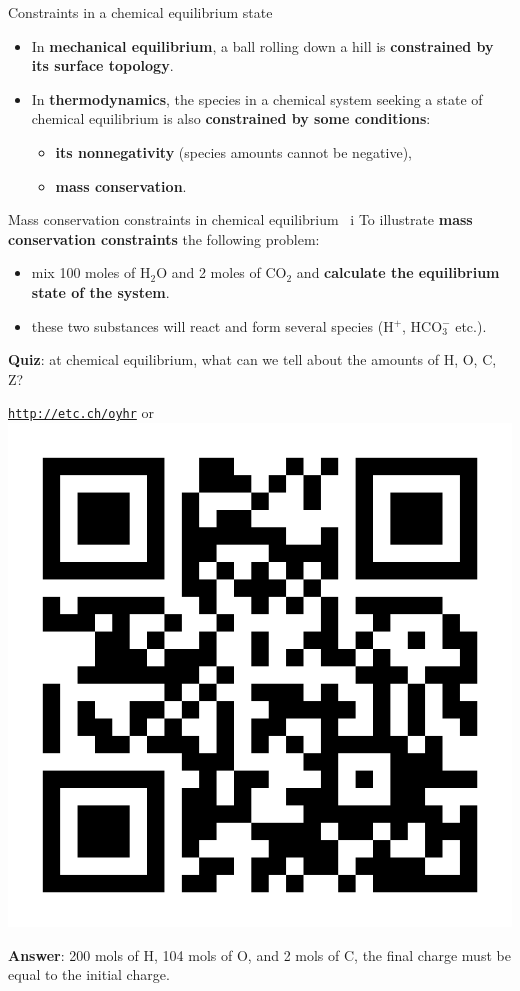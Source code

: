 %
\begin{frame}{Constraints in a chemical equilibrium state}
\begin{itemize}
\item In \alert{\textbf{mechanical equilibrium}}, a ball rolling down a hill is \textbf{constrained by its surface topology}. 
\pause
\item In \textbf{thermodynamics}, the species in a chemical system seeking a state of chemical
equilibrium is also \textbf{constrained by some conditions}: 
\begin{itemize}
\item \textbf{its nonnegativity} (species amounts cannot be negative),
\item \alert{\textbf{mass conservation}}.
\end{itemize}
\end{itemize}
\end{frame}
%
%
%
\begin{frame}{Mass conservation constraints in chemical equilibrium \, i}
%
\vskip 10pt
To illustrate \alert{\textbf{mass conservation constraints}} the following problem: 
\begin{itemize}
\item mix 100 moles of H$_{2}$O and 2 moles of CO$_{2}$
and \textbf{calculate the equilibrium state of the system}. 
\item these two substances will react and form several species (H$^{+}$,
HCO$_{3}^{-}$ etc.).
\end{itemize}
\hiddenpause
\alert{\textbf{Quiz}}: at chemical equilibrium, what can we tell about 
the amounts of H, O, C, Z?

\begin{center}
\href{http://etc.ch/oyhr}{\textcolor{indigo(dye)}{\tt http://etc.ch/oyhr}} 
\quad
or 
\quad
\includegraphics[height=0.21\columnwidth]{figures/chemical-equilibrium/poll-mass-balance.png}
\end{center}

\hiddenpause
\textbf{Answer}: 200 mols of H, 104 mols of O, and 2 mols of C,  the final charge must be equal to the initial charge. 
\end{frame}
